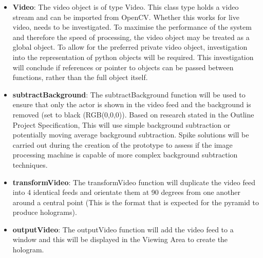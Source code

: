 \documentclass{article}
\begin{document}
\begin{itemize}

	\item \textbf{Video}: The video object is of type Video. This class type holds a video stream and can be imported from OpenCV. Whether this works for live video, needs to be investigated. To maximise the performance of the system and therefore the speed of processing, the video object may be treated as a global object. To allow for the preferred private video object, investigation into the representation of python objects will be required. This investigation will conclude if references or pointer to objects can be passed between functions, rather than the full object itself.

	\item \textbf{subtractBackground}: The subtractBackground function will be used to ensure that only the actor is shown in the video feed and the background is removed (set to black (RGB(0,0,0)). Based on research stated in the Outline Project Specification, This will use simple background subtraction or potentially moving average background subtraction. Spike solutions will be carried out during the creation of the prototype to assess if the image processing machine is capable of more complex background subtraction techniques.

	\item \textbf{transformVideo}: The transformVideo function will duplicate the video feed into 4 identical feeds and orientate them at 90 degrees from one another around a central point (This is the format that is expected for the pyramid to produce holograms).

	\item \textbf{outputVideo}: The outputVideo function will add the video feed to a window and this will be displayed in the Viewing Area to create the hologram.

\end{itemize}
\end{document}
